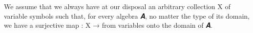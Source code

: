 \documentclass[a4paper,UKenglish,cleveref,autoref,thm-restate]{lipics-v2021}
\begin{document}
We assume that we always have at our disposal an arbitrary collection \ab X of variable symbols such that, for every algebra \ab 𝑨, no matter the type of its domain, we have a surjective map  \as : \ab X \as →  from variables onto the domain of \ab 𝑨.
\ccpad
\begin{code}%
\>[0][@{}l@{\AgdaIndent{1}}]%
\>[1]\AgdaSpace{}%
\AgdaSymbol{:}\AgdaSpace{}%
\AgdaSymbol{\{}\AgdaSpace{}%
\AgdaSpace{}%
\AgdaSymbol{:}\AgdaSpace{}%
\AgdaSymbol{\}}\AgdaSpace{}%
\AgdaSpace{}%
\AgdaSpace{}%
\AgdaSpace{}%
\AgdaSpace{}%
\AgdaSpace{}%
\AgdaSpace{}%
\AgdaSpace{}%
\AgdaSpace{}%
\AgdaSpace{}%
\AgdaSpace{}%
\AgdaSpace{}%
\<%
\\
%
\>[1]\AgdaSpace{}%
\AgdaSpace{}%
\AgdaSpace{}%
\AgdaSymbol{=}\AgdaSpace{}%
\AgdaSpace{}%
\AgdaSpace{}%
\AgdaSpace{}%
\AgdaSymbol{(}\AgdaSpace{}%
\AgdaSpace{}%
\AgdaSpace{}%
\AgdaSpace{}%
\AgdaSymbol{)}\AgdaSpace{}%
\AgdaFunction{,}\AgdaSpace{}%
\AgdaSpace{}%
\<%
\end{code}
\end{document}
